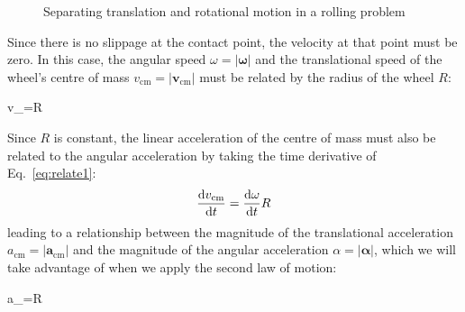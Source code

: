 \begin{figure}[ht]
  \centering
  \caption{Separating translation and rotational motion in a rolling problem}
  \label{fig:trans-and-rot}
\end{figure}
Since there is no slippage at the contact point, the velocity at that point
must be zero. In this case, the angular speed $\omega=|\bm\omega|$ and the
translational speed of the wheel's centre of mass $v_\text{cm}=|\bm v_\text{cm}|$
must be related by the radius of the wheel $R$:
\begin{important-equation}
  \quad\quad v_=\omega R
  \label{eq:relate1}
\end{important-equation}
Since $R$ is constant, the linear acceleration of the centre of mass must also
be related to the angular acceleration by taking the time derivative of
Eq.~\ref{eq:relate1}:
\begin{equation*}
  \diff{v_\text{cm}}t= \diff\omega{t}R
\end{equation*}
leading to a relationship between the magnitude of the translational
acceleration $a_\text{cm}=|\bm a_\text{cm}|$ and the magnitude of the angular
acceleration $\alpha=|\bm\alpha|$, which we will take advantage of when we
apply the second law of motion:
\begin{important-equation}
  \quad\quad a_=\alpha R
\end{important-equation}



